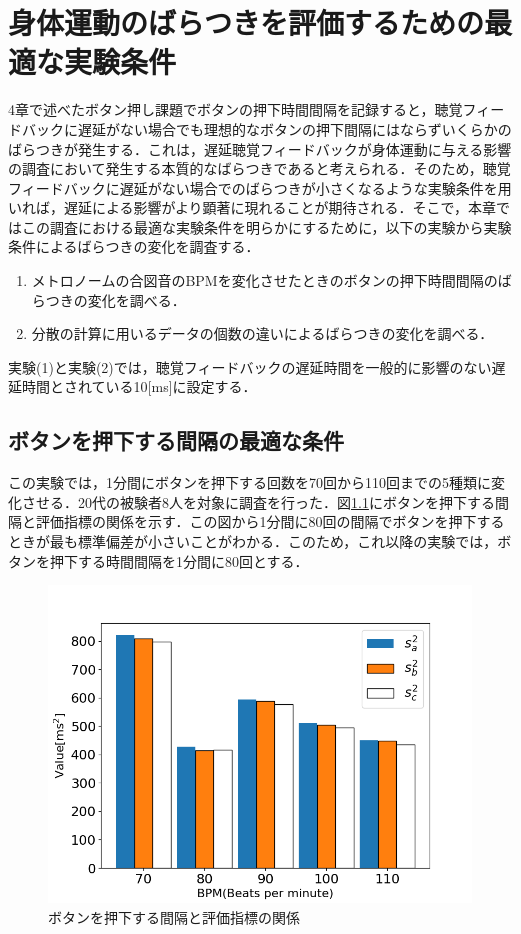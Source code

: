 \chapter{身体運動のばらつきを評価するための最適な実験条件}
4章で述べたボタン押し課題でボタンの押下時間間隔を記録すると，聴覚フィードバックに遅延がない場合でも理想的なボタンの押下間隔にはならずいくらかのばらつきが発生する．これは，遅延聴覚フィードバックが身体運動に与える影響の調査において発生する本質的なばらつきであると考えられる．そのため，聴覚フィードバックに遅延がない場合でのばらつきが小さくなるような実験条件を用いれば，遅延による影響がより顕著に現れることが期待される．そこで，本章ではこの調査における最適な実験条件を明らかにするために，以下の実験から実験条件によるばらつきの変化を調査する．
\begin{enumerate}[leftmargin=*, label=実験(\arabic*)] %
  \item メトロノームの合図音のBPMを変化させたときのボタンの押下時間間隔のばらつきの変化を調べる．
  \item 分散の計算に用いるデータの個数の違いによるばらつきの変化を調べる．
\end{enumerate}
実験(1)と実験(2)では，聴覚フィードバックの遅延時間を一般的に影響のない遅延時間とされている10[ms]に設定する．
\section{ボタンを押下する間隔の最適な条件}
この実験では，1分間にボタンを押下する回数を70回から110回までの5種類に変化させる．20代の被験者8人を対象に調査を行った．図\ref{fig:bpm}にボタンを押下する間隔と評価指標の関係を示す．この図から1分間に80回の間隔でボタンを押下するときが最も標準偏差が小さいことがわかる．このため，これ以降の実験では，ボタンを押下する時間間隔を1分間に80回とする．
\begin{figure}[b]
  \centering
  \includegraphics[scale=0.6]{figures/Yobi/BPM_Change.png}
  \caption{ボタンを押下する間隔と評価指標の関係}
  \label{fig:bpm}
\end{figure}
